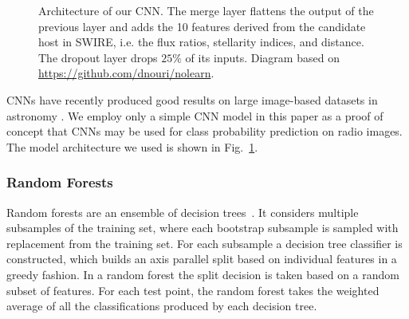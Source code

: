 \documentclass[fleqn,usenatbib,usedcolumn]{mnras}
\newcommand{\todo}[1]{ {\color{red}[{\bf TODO:~{#1}}]} }
\begin{document}
\begin{figure}
        \caption{Architecture of our CNN. The merge layer flattens the output of
          the previous layer and adds the 10 features derived from the
          candidate host in SWIRE, i.e. the flux ratios, stellarity indices,
          and distance. The dropout layer drops $25\%$ of its
          inputs. Diagram based on \url{
          https://github.com/dnouri/nolearn}.}
        \label{fig:cnn}
      \end{figure}


      CNNs have recently produced good results on large image-based datasets in
      astronomy \citep[e.g.][]{dieleman15cnn, lukic17compact}. We employ only a
      simple CNN model in this paper as a proof of concept that CNNs may be used
      for class probability prediction on radio images. The model architecture
      we used is shown in Fig.~\ref{fig:cnn}.

    \subsubsection{Random Forests}
    \label{sec:random-forests}

      Random forests are an ensemble of decision
      trees~\citep{breiman01random-forest}. It considers multiple subsamples
      of the training set, where each bootstrap subsample is sampled with
      replacement from the training set. For each subsample a decision tree
      classifier is constructed, which builds an axis parallel split based on
      individual features in a greedy fashion. In a random forest the split
      decision is taken based on a random subset of features. For each test
      point, the random forest takes the weighted average of all the
      classifications produced by each decision tree.
\end{document}
